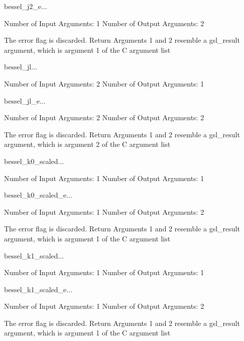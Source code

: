 \begin{funcdesc}{bessel_j2_e}{...}

    Number of Input  Arguments:  1
    Number of Output Arguments:  2

The error flag is discarded.
Return Arguments 1 and 2 resemble a gsl_result argument,
	which is  argument 1 of the C argument list

\end{funcdesc}

\begin{funcdesc}{bessel_jl}{...}

    Number of Input  Arguments:  2
    Number of Output Arguments:  1
\end{funcdesc}

\begin{funcdesc}{bessel_jl_e}{...}

    Number of Input  Arguments:  2
    Number of Output Arguments:  2

The error flag is discarded.
Return Arguments 1 and 2 resemble a gsl_result argument,
	which is  argument 2 of the C argument list

\end{funcdesc}

\begin{funcdesc}{bessel_k0_scaled}{...}

    Number of Input  Arguments:  1
    Number of Output Arguments:  1
\end{funcdesc}

\begin{funcdesc}{bessel_k0_scaled_e}{...}

    Number of Input  Arguments:  1
    Number of Output Arguments:  2

The error flag is discarded.
Return Arguments 1 and 2 resemble a gsl_result argument,
	which is  argument 1 of the C argument list

\end{funcdesc}

\begin{funcdesc}{bessel_k1_scaled}{...}

    Number of Input  Arguments:  1
    Number of Output Arguments:  1
\end{funcdesc}

\begin{funcdesc}{bessel_k1_scaled_e}{...}

    Number of Input  Arguments:  1
    Number of Output Arguments:  2

The error flag is discarded.
Return Arguments 1 and 2 resemble a gsl_result argument,
	which is  argument 1 of the C argument list

\end{funcdesc}

